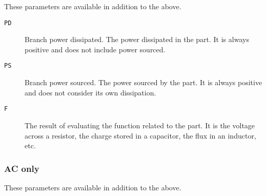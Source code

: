 These parameters are available in addition to the above.

\begin{description}

\item[{\tt PD}] Branch power dissipated.  The power dissipated in the 
part.  It is always positive and does not include power sourced.

\item[{\tt PS}] Branch power sourced.  The power sourced by the part.  
It is always positive and does not consider its own dissipation.

\item[{\tt F}] The result of evaluating the function related to the 
part.  It is the voltage across a resistor, the charge stored in a 
capacitor, the flux in an inductor, etc.

\end{description}
\subsubsection{AC only}

These parameters are available in addition to the above.

